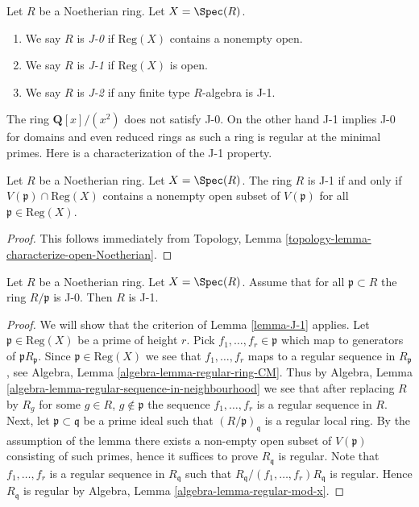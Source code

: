 \begin{definition}
\label{definition-J}
Let $R$ be a Noetherian ring. Let $X = \Spec(R)$.
\begin{enumerate}
\item We say $R$ is {\it J-0} if $\text{Reg}(X)$ contains a nonempty open.
\item We say $R$ is {\it J-1} if $\text{Reg}(X)$ is open.
\item We say $R$ is {\it J-2} if any finite type $R$-algebra is J-1.
\end{enumerate}
\end{definition}

\noindent
The ring $\mathbf{Q}[x]/(x^2)$ does not satisfy J-0. On the other
hand J-1 implies J-0 for domains and even reduced rings as such
a ring is regular at the minimal primes.
Here is a characterization of the J-1 property.

\begin{lemma}
\label{lemma-J-1}
Let $R$ be a Noetherian ring. Let $X = \Spec(R)$.
The ring $R$ is J-1 if and only if $V(\mathfrak p) \cap \text{Reg}(X)$
contains a nonempty open subset of $V(\mathfrak p)$ for all
$\mathfrak p \in \text{Reg}(X)$.
\end{lemma}

\begin{proof}
This follows immediately from
Topology, Lemma \ref{topology-lemma-characterize-open-Noetherian}.
\end{proof}

\begin{lemma}
\label{lemma-intersection-regular-with-closed}
Let $R$ be a Noetherian ring. Let $X = \Spec(R)$. Assume that for all
$\mathfrak p \subset R$ the ring $R/\mathfrak p$ is J-0.
Then $R$ is J-1.
\end{lemma}

\begin{proof}
We will show that the criterion of Lemma \ref{lemma-J-1} applies.
Let $\mathfrak p \in \text{Reg}(X)$ be a prime of height $r$.
Pick $f_1, \ldots, f_r \in \mathfrak p$ which map to generators
of $\mathfrak pR_\mathfrak p$. Since $\mathfrak p \in \text{Reg}(X)$
we see that $f_1, \ldots, f_r$ maps to a regular sequence in $R_\mathfrak p$,
see Algebra, Lemma \ref{algebra-lemma-regular-ring-CM}. Thus by
Algebra, Lemma \ref{algebra-lemma-regular-sequence-in-neighbourhood}
we see that after replacing $R$ by $R_g$ for some $g \in R$,
$g \not \in \mathfrak p$ the sequence $f_1, \ldots, f_r$ is a
regular sequence in $R$. Next, let $\mathfrak p \subset \mathfrak q$
be a prime ideal such that $(R/\mathfrak p)_\mathfrak q$ is
a regular local ring. By the assumption of the lemma there
exists a non-empty open subset of $V(\mathfrak p)$ consisting
of such primes, hence it suffices to prove $R_\mathfrak q$ is regular.
Note that $f_1, \ldots, f_r$ is a regular sequence in $R_\mathfrak q$
such that $R_\mathfrak q/(f_1, \ldots, f_r)R_\mathfrak q$ is regular.
Hence $R_\mathfrak q$ is regular by
Algebra, Lemma \ref{algebra-lemma-regular-mod-x}.
\end{proof}

